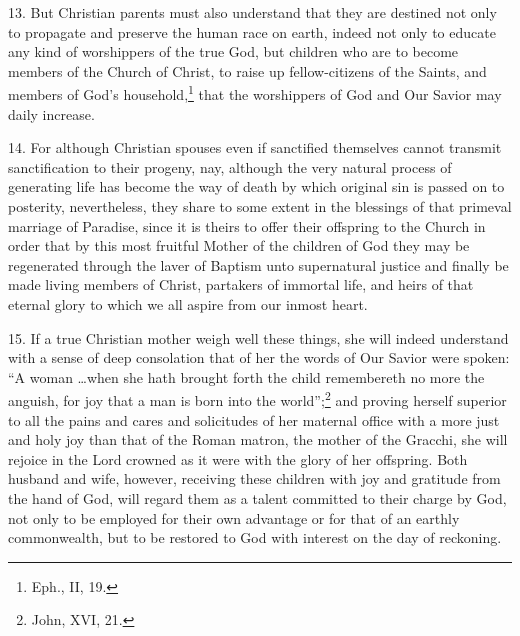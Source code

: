\documentclass[12pt,a4paper]{book}
\begin{document}
13. But Christian parents must also understand that they are destined not only to propagate and preserve the human race on earth, indeed not only to educate any kind of worshippers of the true God, but children who are to become members of the Church of Christ, to raise up fellow-citizens of the Saints, and members of God's household,\footnote{Eph., II, 19.} that the worshippers of God and Our Savior may daily increase.

14. For although Christian spouses even if sanctified themselves cannot transmit sanctification to their progeny, nay, although the very natural process of generating life has become the way of death by which original sin is passed on to posterity, nevertheless, they share to some extent in the blessings of that primeval marriage of Paradise, since it is theirs to offer their offspring to the Church in order that by this most fruitful Mother of the children of God they may be regenerated through the laver of Baptism unto supernatural justice and finally be made living members of Christ, partakers of immortal life, and heirs of that eternal glory to which we all aspire from our inmost heart.

15. If a true Christian mother weigh well these things, she will indeed understand with a sense of deep consolation that of her the words of Our Savior were spoken: ``A woman \ldots when she hath brought forth the child remembereth no more the anguish, for joy that a man is born into the world'';\footnote{John, XVI, 21.} and proving herself superior to all the pains and cares and solicitudes of her maternal office with a more just and holy joy than that of the Roman matron, the mother of the Gracchi, she will rejoice in the Lord crowned as it were with the glory of her offspring. Both husband and wife, however, receiving these children with joy and gratitude from the hand of God, will regard them as a talent committed to their charge by God, not only to be employed for their own advantage or for that of an earthly commonwealth, but to be restored to God with interest on the day of reckoning.
\end{document}
